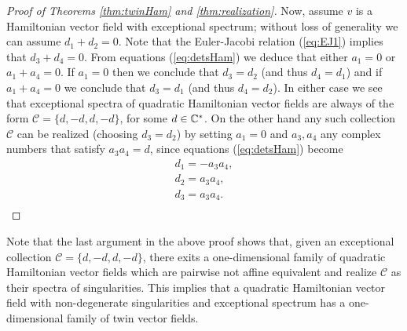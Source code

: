 \documentclass[phd,tocprelim]{cornell}
\begin{document}
\begin{proof}[Proof of Theorems \ref*{thm:twinHam} and \ref*{thm:realization}]
\medskip
Now, assume $v$ is a Hamiltonian vector field with exceptional spectrum; without loss of generality we can assume $d_1+d_2=0$. Note that the Euler-Jacobi relation (\ref{eq:EJ1}) implies that $d_3+d_4=0$. From equations (\ref{eq:detsHam}) we deduce that either $a_1=0$ or $a_1+a_4=0$. If $a_1=0$ then we conclude that $d_3=d_2$ (and thus $d_4=d_1$) and if $a_1+a_4=0$ we conclude that $d_3=d_1$ (and thus $d_4=d_2$). In either case we see that exceptional spectra of quadratic Hamiltonian vector fields are always of the form $\mathcal{C}=\{d,-d,d,-d\}$, for some $d\in\mathbb{C}^{\ast}$. On the other hand any such collection $\mathcal{C}$ can be realized (choosing $d_3=d_2$) by setting $a_1=0$ and $a_3,a_4$ any complex numbers that satisfy $a_3a_4=d$, since equations (\ref{eq:detsHam}) become
\begin{equation*}
\begin{array}{l} 
d_1 = -a_3a_4, \\
d_2 = a_3a_4, \\
d_3 = a_3a_4. \\
\end{array}
\end{equation*}
\end{proof}

Note that the last argument in the above proof shows that, given an exceptional collection $\mathcal{C}=\{d,-d,d,-d\}$, there exits a one-dimensional family of quadratic Hamiltonian vector fields which are pairwise not affine equivalent and realize $\mathcal{C}$ as their spectra of singularities. This implies that a quadratic Hamiltonian vector field with non-degenerate singularities and exceptional spectrum has a one-dimensional family of twin vector fields.
\end{document}

